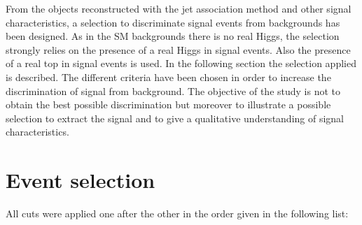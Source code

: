 From the objects reconstructed with the jet association method and other signal characteristics, a selection to discriminate signal events from backgrounds has been designed. As in the SM backgrounds there is no real Higgs, the selection strongly relies on the presence of a real Higgs in signal events. Also the presence of a real top in signal events is used. In the following section the selection applied is described. The different criteria have been chosen in order to increase the discrimination of signal from background. The objective of the study is not to obtain the best possible discrimination but moreover to illustrate a possible selection to extract the signal and to give a qualitative understanding of signal characteristics.

\section{Event selection}
\label{sec:Psel}

All cuts were applied one after the other in the order given in the following list:

